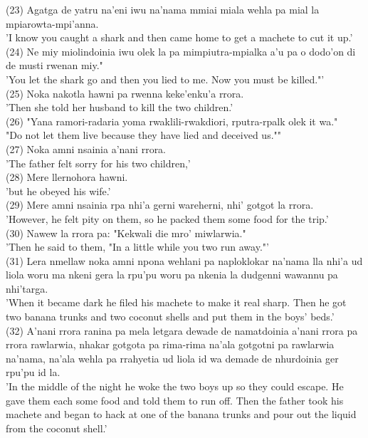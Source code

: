 \documentclass[10pt]{article}
\begin{document}
(23) Agatga de yatru na'eni iwu na'nama mmiai miala wehla pa mial la mpiarowta-mpi'anna.\\
'I know you caught a shark and then came home to get a machete to cut it up.'\\
(24) Ne miy miolindoinia iwu olek la pa mimpiutra-mpialka a'u pa o dodo'on di de musti rwenan miy."\\
'You let the shark go and then you lied to me. Now you must be killed."'\\
(25) Noka nakotla hawni pa rwenna keke'enku'a rrora.\\
'Then she told her husband to kill the two children.'\\
(26) "Yana ramori-radaria yoma rwaklili-rwakdiori, rputra-rpalk olek it wa."\\
"Do not let them live because they have lied and deceived us.""\\
(27) Noka amni nsainia a'nani rrora.\\
'The father felt sorry for his two children,'\\
(28) Mere llernohora hawni.\\
'but he obeyed his wife.'\\
(29) Mere amni nsainia rpa nhi'a gerni wareherni, nhi' gotgot la rrora.\\
'However, he felt pity on them, so he packed them some food for the trip.'\\
(30) Nawew la rrora pa: "Kekwali die mro' miwlarwia."\\
'Then he said to them, "In a little while you two run away."'\\
(31) Lera nmellaw noka amni npona wehlani pa naploklokar na'nama lla nhi'a ud liola woru ma nkeni gera la rpu'pu woru pa nkenia la dudgenni wawannu pa nhi'targa.\\
'When it became dark he filed his machete to make it real sharp. Then he got two banana trunks and two coconut shells and put them in the boys' beds.'\\
(32) A'nani rrora ranina pa mela letgara dewade de namatdoinia a'nani rrora pa rrora rawlarwia, nhakar gotgota pa rima-rima na'ala gotgotni pa rawlarwia na'nama, na'ala wehla pa rrahyetia ud liola id wa demade de nhurdoinia ger rpu'pu id la.\\
'In the middle of the night he woke the two boys up so they could escape. He gave them each some food and told them to run off. Then the father took his machete and began to hack at one of the banana trunks and pour out the liquid from the coconut shell.'\\
\end{document}
